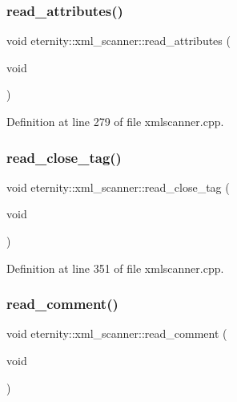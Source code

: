 \subsubsection{\texorpdfstring{read\+\_\+attributes()}{read\_attributes()}}
{\footnotesize\ttfamily void eternity\+::xml\+\_\+scanner\+::read\+\_\+attributes (\begin{DoxyParamCaption}\item[{void}]{ }\end{DoxyParamCaption})\hspace{0.3cm}{\ttfamily [protected]}}



Definition at line 279 of file xmlscanner.\+cpp.

\mbox{\label{classeternity_1_1xml__scanner_a1e29dfbc46de1741707e9e63dffaee25}} 
\subsubsection{\texorpdfstring{read\+\_\+close\+\_\+tag()}{read\_close\_tag()}}
{\footnotesize\ttfamily void eternity\+::xml\+\_\+scanner\+::read\+\_\+close\+\_\+tag (\begin{DoxyParamCaption}\item[{void}]{ }\end{DoxyParamCaption})\hspace{0.3cm}{\ttfamily [protected]}}



Definition at line 351 of file xmlscanner.\+cpp.

\mbox{\label{classeternity_1_1xml__scanner_a0f8d1cdba0e72846f8dd9710eedcc7c8}} 
\subsubsection{\texorpdfstring{read\+\_\+comment()}{read\_comment()}}
{\footnotesize\ttfamily void eternity\+::xml\+\_\+scanner\+::read\+\_\+comment (\begin{DoxyParamCaption}\item[{void}]{ }\end{DoxyParamCaption})\hspace{0.3cm}{\ttfamily [protected]}}



